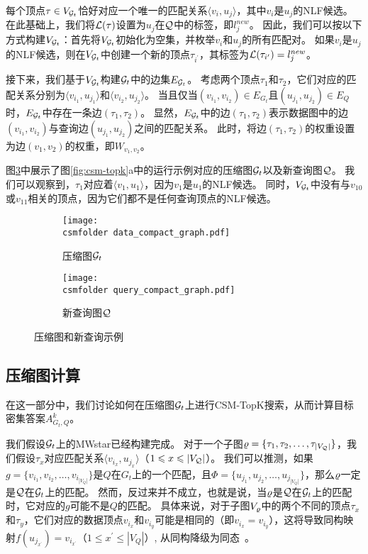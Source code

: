 每个顶点$\tau \in V_{\mathcal{G}_t}$恰好对应一个唯一的匹配关系$\langle v_i, u_j \rangle$，其中$v_i$是$u_j$的NLF候选。
在此基础上，我们将$\mathcal{L}(\tau)$设置为$u_j$在$\mathcal{Q}$中的标签，即$l_j^{new}$。
因此，我们可以按以下方式构建$V_{\mathcal{G}_t}$：首先将$V_{\mathcal{G}_t}$初始化为空集，并枚举$v_i$和$u_j$的所有匹配对。
如果$v_i$是$u_j$的NLF候选，则在$V_{\mathcal{G}_t}$中创建一个新的顶点$\tau_{i^\prime}$，其标签为$\mathcal{L}(\tau_{i^\prime}) = l_j^{new}$。

接下来，我们基于$V_{\mathcal{G}_t}$构建$\mathcal{G}_t$中的边集$E_{\mathcal{G}_t}$。
考虑两个顶点$\tau_1$和$\tau_2$，它们对应的匹配关系分别为$\langle v_{i_1}, u_{j_1} \rangle$和$\langle v_{i_2}, u_{j_2} \rangle$。
当且仅当$(v_{i_1}, v_{i_2}) \in E_{G_t}$且$(u_{j_1}, u_{j_2}) \in E_Q$时，$E_{\mathcal{G}_t}$中存在一条边$(\tau_1, \tau_2)$。
显然，$E_{\mathcal{G}_t}$中的边$(\tau_1, \tau_2)$表示数据图中的边$(v_{i_1}, v_{i_2})$与查询边$(u_{j_1}, u_{j_2})$之间的匹配关系。
此时，将边$(\tau_1, \tau_2)$的权重设置为边$(v_1, v_2)$的权重，即$W_{v_1, v_2}$。

图\ref{fig:compact}中展示了图\ref{fig:csm-topk}a中的运行示例对应的压缩图$\mathcal{G}_t$以及新查询图$\mathcal{Q}$。
我们可以观察到，$\tau_1$对应着$\langle v_1, u_1 \rangle$，因为$v_1$是$u_1$的NLF候选。
同时，$V_{\mathcal{G}_t}$中没有与$v_{10}$或$v_{11}$相关的顶点，因为它们都不是任何查询顶点的NLF候选。

\begin{figure}[h!]
\def\wscorevone{0.62}
\centering
\begin{subfigure}[t]{\wscorevone\linewidth}
\centering
\resizebox{\linewidth}{!}
{
\texttt{[image: \\csmfolder data\_compact\_graph.pdf]}
}
\caption{压缩图$\mathcal{G}_t$}
\label{fig:data_compact_graph}
\end{subfigure}
\begin{subfigure}[t]{0.35\linewidth}
\centering
\resizebox{\linewidth}{!}
{
\texttt{[image: \\csmfolder query\_compact\_graph.pdf]}
}
\caption{新查询图$\mathcal{Q}$}
\label{fig:query_compact_graph}
\end{subfigure}
\caption{压缩图和新查询示例}
\label{fig:compact}
\end{figure}


\subsection{压缩图计算}
在这一部分中，我们讨论如何在压缩图$\mathcal{G}_t$上进行CSM-TopK搜索，从而计算目标密集答案$A_{G_t, Q}^k$。

我们假设$\mathcal{G}_t$上的MWstar已经构建完成。
对于一个子图$\varrho = \{\tau_1, \tau_2, \dots, \tau_{|V_{\mathcal{Q}}|}\}$，我们假设$\tau_x$对应匹配关系$\langle v_{i_x}, u_{j_x} \rangle$（$1 \leqslant x \leqslant |V_{\mathcal{Q}}|$）。
我们可以推测，如果$g = \{v_{i_1}, v_{i_2}, \dots, v_{i_{|V_Q|}}\}$是$Q$在$G_t$上的一个匹配，且$\Phi = \{u_{j_1}, u_{j_2}, \dots, u_{j_{|V_Q|}}\}$，那么$\varrho$一定是$\mathcal{Q}$在$\mathcal{G}_t$上的匹配。
然而，反过来并不成立，也就是说，当$\varrho$是$\mathcal{Q}$在$\mathcal{G}_t$上的匹配时，它对应的$g$可能不是$Q$的匹配。
具体来说，对于子图$V_{\varrho}$中的两个不同的顶点$\tau_x$和$\tau_y$，它们对应的数据顶点$v_{i_x}$和$v_{i_y}$可能是相同的（即$v_{i_x} = v_{i_y}$），这将导致同构映射$f(u_{j_{x^\prime}}) = v_{i_{x^\prime}}$（$1 \leq x^\prime \leq |V_Q|$）, 从同构降级为同态~\cite{homomorphism-DBLP:conf/soda/CyganFGKMPS16}。

